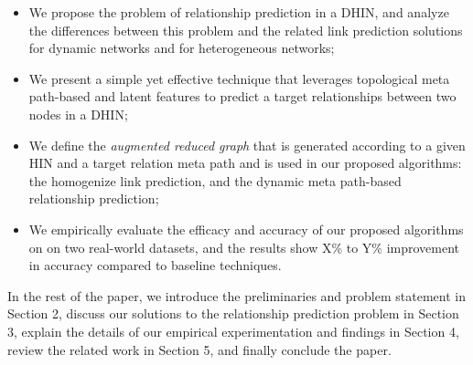 \begin{itemize}

\item We propose the problem of relationship prediction in a DHIN, and analyze the differences between this problem and the related link prediction solutions for dynamic networks and for heterogeneous networks;

\item We present a simple yet effective technique that leverages topological meta path-based and latent features to predict a target relationships between two nodes in a DHIN;

\item We define the \textit{augmented reduced graph} that is generated according to a given HIN and a target relation meta path and is used in our proposed algorithms: the homogenize link prediction, and the dynamic meta path-based relationship prediction;


\item We empirically evaluate the efficacy and accuracy of our proposed algorithms on on two real-world datasets, and the results show X\% to Y\% improvement in accuracy  compared to baseline techniques.

\end{itemize}


In the rest of the paper, we introduce the preliminaries and problem statement in Section 2, discuss our solutions to the relationship prediction problem in Section 3, explain the details of our empirical experimentation and findings in Section 4, review the related work in Section 5, and finally conclude the paper.
